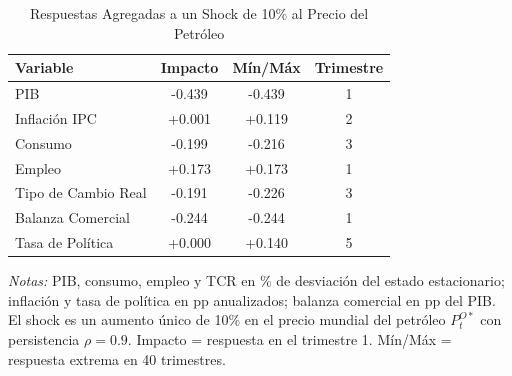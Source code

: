 \begin{table}[htbp]
\centering
\caption{Respuestas Agregadas a un Shock de 10\% al Precio del Petróleo}
\label{tab:oil_agg}
\begin{threeparttable}
\begin{tabular}{@{}l c c c@{}}
\toprule
Variable & Impacto & Mín/Máx & Trimestre \\
\midrule
PIB & -0.439 & -0.439 & 1 \\
Inflación IPC & +0.001 & +0.119 & 2 \\
Consumo & -0.199 & -0.216 & 3 \\
Empleo & +0.173 & +0.173 & 1 \\
Tipo de Cambio Real & -0.191 & -0.226 & 3 \\
Balanza Comercial & -0.244 & -0.244 & 1 \\
Tasa de Política & +0.000 & +0.140 & 5 \\
\bottomrule
\end{tabular}
\begin{tablenotes}[flushleft]
\footnotesize
\item \textit{Notas:} PIB, consumo, empleo y TCR en \% de desviación del estado estacionario; inflación y tasa de política en pp anualizados; balanza comercial en pp del PIB. El shock es un aumento único de 10\% en el precio mundial del petróleo $P^{O*}_t$ con persistencia $\rho = 0.9$. Impacto = respuesta en el trimestre 1. Mín/Máx = respuesta extrema en 40 trimestres.
\end{tablenotes}
\end{threeparttable}
\end{table}
